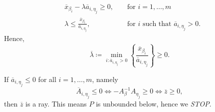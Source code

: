 \begin{enumerate}
		\[
			\begin{alignedat}{3}
				&\overline{x}_{\beta_{i}} - \lambda \overline{a}_{i, \eta_{j}}\geq 0, &&\text{ for }i = 1, \ldots , m\\
				& \lambda \leq \frac{\overline{x}_{\beta_{i}}}{\overline{a}_{i, \eta_{j}}}, &&\text{ for }i \text{ such that }\overline{a}_{i, \eta_j}>0.
			\end{alignedat}
		\]
		Hence,
		\[
			\overline{\lambda} \coloneqq \min_{i: \overline{a}_{i, \eta_{j}}>0} \left\{ \frac{\overline{x}_{\beta_{i}}}{\overline{a}_{i, \eta_{j}}} \right\} \geq 0.
		\]
		\begin{remark}
			If \(\overline{a}_{i, \eta_{j}}\leq 0\) for all \(i = 1, \ldots , m\), namely
			\[
				\overline{A}_{i, \eta_{j}}\leq 0 \iff -A^{-1}_{\beta}A_{\eta_{j}}\geq 0 \iff \overline{z}\geq 0,
			\]
			then \(\overline{z}\) is a ray. This means \(P\) is unbounded below, hence we \emph{STOP}.
		\end{remark}
\end{enumerate}

